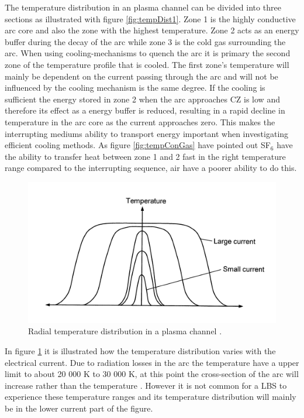 \documentclass[10pt,a4paper]{article} %
\begin{document}
The temperature distribution in an plasma channel can be divided into three sections \cite{bib:TDCIGBB} as illustrated with figure \ref{fig:tempDist1}. Zone 1 is the highly conductive arc core and also the zone with the highest temperature. Zone 2 acts as an energy buffer during the decay of the arc while zone 3 is the cold gas surrounding the arc. When using cooling-mechanisms to quench the arc it is primary the second zone of the temperature profile that is cooled. The first zone's temperature will mainly be dependent on the current passing through the arc and will not be influenced by the cooling mechanism is the same degree. If the cooling is sufficient the energy stored in zone 2 when the arc approaches CZ is low and therefore its effect as a energy buffer is reduced, resulting in a rapid decline in temperature in the arc core as the current approaches zero. This makes the interrupting mediums ability to transport energy important when investigating efficient cooling methods. As figure \ref{fig:tempConGas} have pointed out SF$_6$ have the ability to transfer heat between zone 1 and 2 fast in the right temperature range compared to the interrupting sequence, air have a poorer ability to do this.

\begin{figure}[H]
\centering
\includegraphics[scale=0.8]{Bilder/Theory/plasmaChannel1.png}
\caption{Radial temperature distribution in a plasma channel \cite{bib:HVEbreak}.} \label{fig:tempDist2}
\end{figure}

In figure \ref{fig:tempDist2} it is illustrated how the temperature distribution varies with the electrical current. Due to radiation losses in the arc the temperature have a upper limit to about 20 000 K to 30 000 K, at this point the cross-section of the arc will increase rather than the temperature \cite{bib:HVEbreak}. However it is not common for a LBS to experience these temperature ranges and its temperature distribution will mainly be in the lower current part of the figure.
\end{document}

